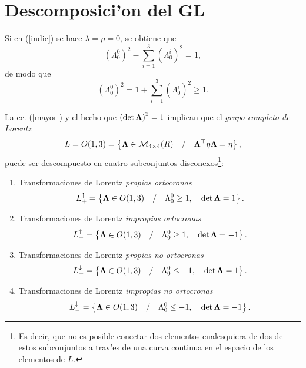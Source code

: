 \section{Descomposici'on del GL\label{descom}}

Si en (\ref{indic}) se hace $\lambda =\rho =0$, se obtiene que 
\begin{equation}
\left( \Lambda _{0}^0\right) ^2-\sum_{i=1}^3\left( \Lambda
_{0}^{i}\right) ^2=1, 
\end{equation}
de modo que 
\begin{equation}
\left( \Lambda _{0}^0\right) ^2=1+\sum_{i=1}^3\left( \Lambda
_{0}^{i}\right) ^2\geq 1.  \label{mayor}
\end{equation}

La ec. (\ref{mayor}) y el hecho que $\left( \det {\bf \Lambda }\right)
^2=1 $ implican que el {\em grupo completo de Lorentz} 
\begin{equation}
L=O(1,3)=\left\{ {\bf \Lambda }\in {\cal M}_{4\times 4}(R)\quad /\quad {\bf %
\Lambda }^{\top }{\bf \eta \Lambda =\eta }\right\} , 
\end{equation}
puede ser descompuesto en cuatro subconjuntos disconexos\footnote{%
Es decir, que no es posible conectar dos elementos cualesquiera de dos de
estos subconjuntos a trav'es de una curva continua en el espacio de los
elementos de $L$.}:

\begin{enumerate}
\item  Transformaciones de Lorentz {\em propias ortocronas} 
\begin{equation}
L_{+}^{\uparrow }=\left\{ {\bf \Lambda }\in O(1,3)\quad /\quad \Lambda
_{0}^0\geq 1,\quad \det {\bf \Lambda }=1\right\} .
\end{equation}

\item  Transformaciones de Lorentz {\em impropias ortocronas} 
\begin{equation}
L_{-}^{\uparrow }=\left\{ {\bf \Lambda }\in O(1,3)\quad /\quad \Lambda
_{0}^0\geq 1,\quad \det {\bf \Lambda }=-1\right\} .
\end{equation}

\item  Transformaciones de Lorentz {\em propias no ortocronas} 
\begin{equation}
L_{+}^{\downarrow }=\left\{ {\bf \Lambda }\in O(1,3)\quad /\quad \Lambda
_{0}^0\leq -1,\quad \det {\bf \Lambda }=1\right\} .
\end{equation}

\item  Transformaciones de Lorentz {\em impropias no ortocronas} 
\begin{equation}
L_{-}^{\downarrow }=\left\{ {\bf \Lambda }\in O(1,3)\quad /\quad \Lambda
_{0}^0\leq -1,\quad \det {\bf \Lambda }=-1\right\} .
\end{equation}
\end{enumerate}

